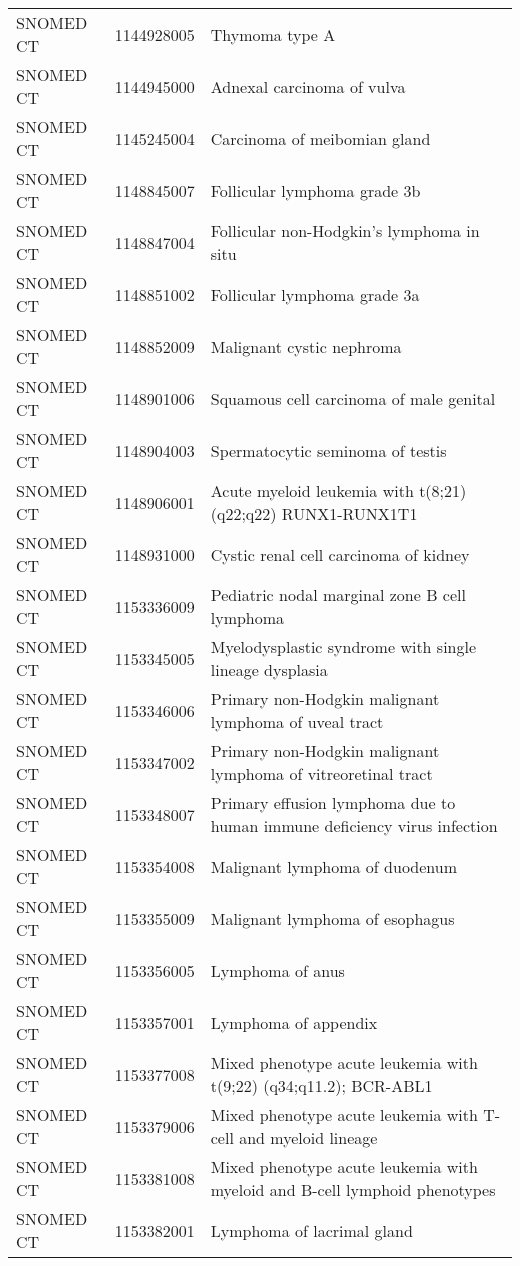 \begin{longtable}{p{}p{}p{}}
  SNOMED CT & 1144928005 & Thymoma type A \\ 
  SNOMED CT & 1144945000 & Adnexal carcinoma of vulva \\ 
  SNOMED CT & 1145245004 & Carcinoma of meibomian gland \\ 
  SNOMED CT & 1148845007 & Follicular lymphoma grade 3b \\ 
  SNOMED CT & 1148847004 & Follicular non-Hodgkin's lymphoma in situ \\ 
  SNOMED CT & 1148851002 & Follicular lymphoma grade 3a \\ 
  SNOMED CT & 1148852009 & Malignant cystic nephroma \\ 
  SNOMED CT & 1148901006 & Squamous cell carcinoma of male genital \\ 
  SNOMED CT & 1148904003 & Spermatocytic seminoma of testis \\ 
  SNOMED CT & 1148906001 & Acute myeloid leukemia with t(8;21)(q22;q22) RUNX1-RUNX1T1 \\ 
  SNOMED CT & 1148931000 & Cystic renal cell carcinoma of kidney \\ 
  SNOMED CT & 1153336009 & Pediatric nodal marginal zone B cell lymphoma \\ 
  SNOMED CT & 1153345005 & Myelodysplastic syndrome with single lineage dysplasia \\ 
  SNOMED CT & 1153346006 & Primary non-Hodgkin malignant lymphoma of uveal tract \\ 
  SNOMED CT & 1153347002 & Primary non-Hodgkin malignant lymphoma of vitreoretinal tract \\ 
  SNOMED CT & 1153348007 & Primary effusion lymphoma due to human immune deficiency virus infection \\ 
  SNOMED CT & 1153354008 & Malignant lymphoma of duodenum \\ 
  SNOMED CT & 1153355009 & Malignant lymphoma of esophagus \\ 
  SNOMED CT & 1153356005 & Lymphoma of anus \\ 
  SNOMED CT & 1153357001 & Lymphoma of appendix \\ 
  SNOMED CT & 1153377008 & Mixed phenotype acute leukemia with t(9;22) (q34;q11.2); BCR-ABL1 \\ 
  SNOMED CT & 1153379006 & Mixed phenotype acute leukemia with T-cell and myeloid lineage \\ 
  SNOMED CT & 1153381008 & Mixed phenotype acute leukemia with myeloid and B-cell lymphoid phenotypes \\ 
  SNOMED CT & 1153382001 & Lymphoma of lacrimal gland \\ 

\end{longtable}
